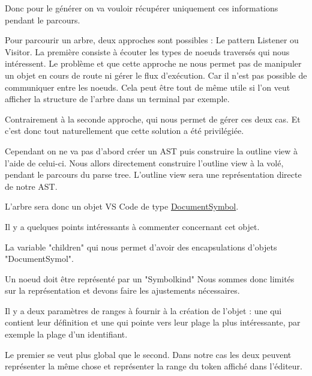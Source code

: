 \documentclass[
    iict, %
    il, %
]{heig-tb}
\begin{document}
Donc pour le générer on va vouloir récupérer uniquement ces informations pendant le parcours.

Pour parcourir un arbre, deux approches sont possibles : Le pattern Listener ou Visitor.
La première consiste à écouter les types de noeuds traversés qui nous intéressent. Le problème et que cette approche ne nous permet pas de manipuler un objet en cours de route ni gérer le flux d'exécution.
Car il n'est pas possible de communiquer entre les noeuds. Cela peut être tout de même utile si l'on veut afficher la structure de l'arbre dans un terminal par exemple.

Contrairement à la seconde approche, qui nous permet de gérer ces deux cas. Et c'est donc tout naturellement que cette solution a été privilégiée.

Cependant on ne va pas d'abord créer un AST puis construire la outline view à l'aide de celui-ci.
Nous allors directement construire l'outline view à la volé, pendant le parcours du parse tree. L'outline view sera une représentation directe de notre AST.

L'arbre sera donc un objet VS Code de type \href{https://code.visualstudio.com/api/references/vscode-api#DocumentSymbol}{DocumentSymbol}.

Il y a quelques points intéressants à commenter concernant cet objet.

La variable "children" qui nous permet d'avoir des encapsulations d'objets "DocumentSymol".

Un noeud doit être représenté par un "Symbolkind" %
Nous sommes donc limités sur la représentation et devons faire les ajustements nécessaires.

Il y a deux paramètres de ranges à fournir à la création de l'objet : une qui contient leur définition et une qui pointe vers leur plage la plus intéressante, par exemple la plage d'un identifiant.

Le premier se veut plus global que le second.
Dans notre cas les deux peuvent représenter la même chose et représenter la range du token affiché dans l'éditeur.

\end{document}
